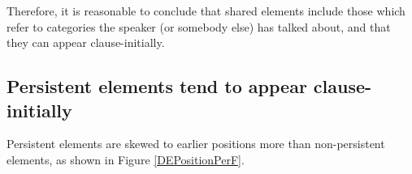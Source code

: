 \newpage
Therefore, it is reasonable to conclude that
shared elements include those which refer to categories the speaker (or somebody else) has talked about, and that they can appear clause-initially.


\subsection{Persistent elements tend to appear clause-initially}\label{PersistentAppearClause-Initially}

Persistent elements are skewed to earlier positions more than non-persistent elements,
as shown in Figure \ref{DEPositionPerF}.

